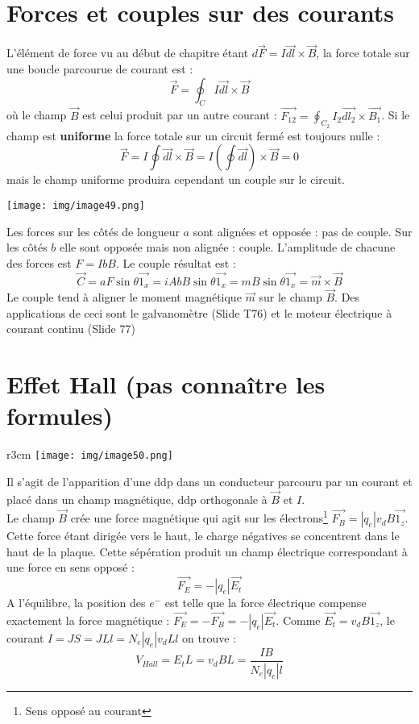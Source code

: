 \documentclass	[11pt, a4paper, openany]{book}
\begin{document}
\section{Forces et couples sur des courants}
L'élément de force vu au début de chapitre étant $d\vec{F} = I \vec{dl}\times\vec{B}$, la force totale sur une boucle parcourue de courant est :
\begin{equation}
\vec{F} = \oint_C I \vec{dl}\times\vec{B}
\end{equation}
où le champ $\vec{B}$ est celui produit par un autre courant : $\vec{F_{12}} = \oint_{C_2} I_2\vec{dl_2}\times\vec{B_1}$. Si le champ est \textbf{uniforme} la force totale sur un circuit fermé est toujours nulle :
\begin{equation}
\vec{F} = I \oint \vec{dl}\times\vec{B} = I\left(\oint \vec{dl}\right) \times \vec{B} = 0
\end{equation}
mais le champ uniforme produira cependant un couple sur le circuit.
\begin{center}
\texttt{[image: img/image49.png]}
\end{center}
Les forces sur les côtés de longueur $a$ sont alignées et opposée : pas de couple. Sur les côtés $b$ elle sont opposée mais non alignée : couple. L'amplitude de chacune des forces est $F = IbB$. Le couple résultat est :
\begin{equation}
\vec{C} = a F \sin\theta \vec{1_x} = i A b B \sin\theta\vec{1_x} = mB\sin\theta\vec{1_x} = \vec{m}\times\vec{B}
\end{equation}
Le couple tend à aligner le moment magnétique $\vec m$ sur le champ $\vec{B}$. Des applications de ceci sont le galvanomètre (Slide T76) et le moteur électrique à courant continu (Slide 77)

\section{Effet Hall (pas connaître les formules)}
\begin{wrapfigure}[12]{r}{3cm}
\texttt{[image: img/image50.png]}
\end{wrapfigure}
Il s'agit de l'apparition d'une ddp dans un conducteur parcouru par un courant et placé dans un champ magnétique, ddp orthogonale à $\vec B$ et $I$.\\
Le champ $\vec{B}$ crée une force magnétique qui agit sur les électrons\footnote{Sens opposé au courant} $\vec{F_B} = |q_e|v_dB\vec{1_z}$. Cette force étant dirigée vers le haut, le charge négatives se concentrent dans le haut de la plaque. Cette sépération produit un champ électrique correspondant à une force en sens opposé :
\begin{equation}
\vec{F_E} = -|q_e|\vec{E_t}
\end{equation}
A l'équilibre, la position des $e^-$ est telle que la force électrique compense exactement la force magnétique : $\vec{F_E} = -\vec{F_B} = -|q_e|\vec{E_t}$. Comme $\vec{E_t} = v_dB\vec{1_z}$, le courant $I = JS = JLl = N_e|q_e|v_dLl$ on trouve :
\begin{equation}
V_{Hall} = E_t L = v_dBL = \frac{IB}{N_e |q_e| l}
\end{equation}
\end{document}
